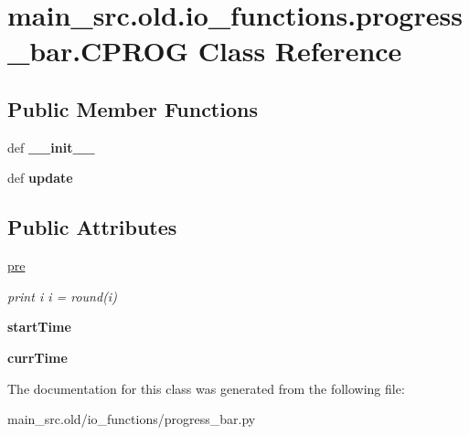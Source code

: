 \hypertarget{classmain__src_8old_1_1io__functions_1_1progress__bar_1_1CPROG}{\section{main\-\_\-src.\-old.\-io\-\_\-functions.\-progress\-\_\-bar.\-C\-P\-R\-O\-G Class Reference}
\label{classmain__src_8old_1_1io__functions_1_1progress__bar_1_1CPROG}
}
\subsection*{Public Member Functions}
\begin{DoxyCompactItemize}
\item 
\hypertarget{classmain__src_8old_1_1io__functions_1_1progress__bar_1_1CPROG_a74b3d114ebde30df187b4d1edd79fded}{def {\bfseries \-\_\-\-\_\-init\-\_\-\-\_\-}}\label{classmain__src_8old_1_1io__functions_1_1progress__bar_1_1CPROG_a74b3d114ebde30df187b4d1edd79fded}

\item 
\hypertarget{classmain__src_8old_1_1io__functions_1_1progress__bar_1_1CPROG_ac7d6925131eb7ad987d6cf2ad0fe210e}{def {\bfseries update}}\label{classmain__src_8old_1_1io__functions_1_1progress__bar_1_1CPROG_ac7d6925131eb7ad987d6cf2ad0fe210e}

\end{DoxyCompactItemize}
\subsection*{Public Attributes}
\begin{DoxyCompactItemize}
\item 
\hypertarget{classmain__src_8old_1_1io__functions_1_1progress__bar_1_1CPROG_aefe32778bad8e546e90805df804376b4}{\hyperlink{classmain__src_8old_1_1io__functions_1_1progress__bar_1_1CPROG_aefe32778bad8e546e90805df804376b4}{pre}}\label{classmain__src_8old_1_1io__functions_1_1progress__bar_1_1CPROG_aefe32778bad8e546e90805df804376b4}

\begin{DoxyCompactList}\small\item\em print i i = round(i) \end{DoxyCompactList}\item 
\hypertarget{classmain__src_8old_1_1io__functions_1_1progress__bar_1_1CPROG_a60852d79379095c79ce2bb3509a97d6e}{{\bfseries start\-Time}}\label{classmain__src_8old_1_1io__functions_1_1progress__bar_1_1CPROG_a60852d79379095c79ce2bb3509a97d6e}

\item 
\hypertarget{classmain__src_8old_1_1io__functions_1_1progress__bar_1_1CPROG_a48508ca1b804a649a7f558cdd8de8d78}{{\bfseries curr\-Time}}\label{classmain__src_8old_1_1io__functions_1_1progress__bar_1_1CPROG_a48508ca1b804a649a7f558cdd8de8d78}

\end{DoxyCompactItemize}


The documentation for this class was generated from the following file\-:\begin{DoxyCompactItemize}
\item 
main\-\_\-src.\-old/io\-\_\-functions/progress\-\_\-bar.\-py\end{DoxyCompactItemize}
